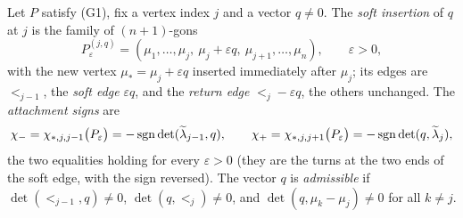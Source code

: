 \begin{definition}\label{def:soft}
Let $P$ satisfy (G1), fix a vertex index $j$ and a vector $q\neq0$. The
\emph{soft insertion} of $q$ at $j$ is the family of $(n+1)$-gons
\[
P^{(j,q)}_\varepsilon=(\mu_1,\ldots,\mu_j,\ \mu_j+\varepsilon q,\ \mu_{j+1},\ldots,\mu_n),
\qquad\varepsilon>0,
\]
with the new vertex $\mu_*=\mu_j+\varepsilon q$ inserted immediately after
$\mu_j$; its edges are $\lt_{j-1}$, the \emph{soft edge} $\varepsilon q$, and
the \emph{return edge} $\lt_j-\varepsilon q$, the others unchanged. The
\emph{attachment signs} are
\[
\chi_-=\chi_{*,j,j-1}\bigl(P_\varepsilon\bigr)=-\operatorname{sgn}\det(\widetilde\lambda_{j-1},q),\qquad
\chi_+=\chi_{*,j,j+1}\bigl(P_\varepsilon\bigr)=-\operatorname{sgn}\det(q,\widetilde\lambda_j),
\]
the two equalities holding for every $\varepsilon>0$ (they are the turns at
the two ends of the soft edge, with the sign reversed). The vector $q$ is
\emph{admissible} if $\det(\lt_{j-1},q)\neq0$, $\det(q,\lt_j)\neq0$, and
$\det(q,\mu_k-\mu_j)\neq0$ for all $k\neq j$.
\end{definition}

